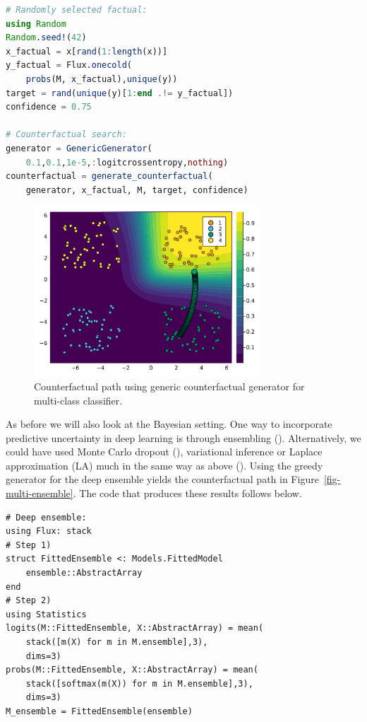 \documentclass[
  letterpaper,
  DIV=11,
  numbers=noendperiod]{scrartcl}
\begin{document}
\begin{lstlisting}[language = Julia]
# Randomly selected factual:
using Random
Random.seed!(42)
x_factual = x[rand(1:length(x))]
y_factual = Flux.onecold(
    probs(M, x_factual),unique(y))
target = rand(unique(y)[1:end .!= y_factual]) 
confidence = 0.75

# Counterfactual search:
generator = GenericGenerator(
    0.1,0.1,1e-5,:logitcrossentropy,nothing)
counterfactual = generate_counterfactual(
    generator, x_factual, M, target, confidence)
\end{lstlisting}

\begin{figure}

{\centering \includegraphics[width=3.33333in,height=2.5in]{www/ce_multi.png}

}

\caption{\label{fig-multi}Counterfactual path using generic
counterfactual generator for multi-class classifier.}

\end{figure}

As before we will also look at the Bayesian setting. One way to
incorporate predictive uncertainty in deep learning is through
ensembling (\cite{lakshminarayanan2016simple}). Alternatively, we could
have used Monte Carlo dropout (\cite{gal2016dropout}), variational
inference or Laplace approximation (LA) much in the same way as above
(\cite{daxberger2021laplace}). Using the greedy generator for the deep
ensemble yields the counterfactual path in
Figure~\ref{fig-multi-ensemble}. The code that produces these results
follows below.

\begin{lstlisting}
# Deep ensemble:
using Flux: stack
# Step 1)
struct FittedEnsemble <: Models.FittedModel
    ensemble::AbstractArray
end
# Step 2)
using Statistics
logits(M::FittedEnsemble, X::AbstractArray) = mean(
    stack([m(X) for m in M.ensemble],3), 
    dims=3)
probs(M::FittedEnsemble, X::AbstractArray) = mean(
    stack([softmax(m(X)) for m in M.ensemble],3),
    dims=3)
M_ensemble = FittedEnsemble(ensemble)
\end{lstlisting}
\end{document}
